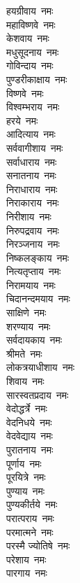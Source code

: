 \begin{flushleft}
\begin{multicols}{2}
हयग्रीवाय~नमः\\
महाविष्णवे~नमः\\
केशवाय~नमः\\
मधुसूदनाय~नमः\\
गोविन्दाय~नमः\\
पुण्डरीकाक्षाय~नमः\\
विष्णवे~नमः\\
विश्वम्भराय~नमः\\
हरये~नमः\\
आदित्याय~नमः\hfill{}\\
सर्ववागीशाय~नमः\\
सर्वाधाराय~नमः\\
सनातनाय~नमः\\
निराधाराय~नमः\\
निराकाराय~नमः\\
निरीशाय~नमः\\
निरुपद्रवाय~नमः\\
निरञ्जनाय~नमः\\
निष्कलङ्काय~नमः\\
नित्यतृप्ताय~नमः\hfill{}\\
निरामयाय~नमः\\
चिदानन्दमयाय~नमः\\
साक्षिणे~नमः\\
शरण्याय~नमः\\
सर्वदायकाय~नमः\\
श्रीमते~नमः\\
लोकत्रयाधीशाय~नमः\\
शिवाय~नमः\\
सारस्वतप्रदाय~नमः\\
वेदोद्धर्त्रे~नमः\hfill{}\\
वेदनिधये~नमः\\
वेदवेद्याय~नमः\\
पुरातनाय~नमः\\
पूर्णाय~नमः\\
पूरयित्रे~नमः\\
पुण्याय~नमः\\
पुण्यकीर्तये~नमः\\
परात्पराय~नमः\\
परमात्मने~नमः\\
परस्मै ज्योतिषे~नमः\hfill{}\\
परेशाय~नमः\\
पारगाय~नमः\\

\end{multicols}
\end{flushleft}
